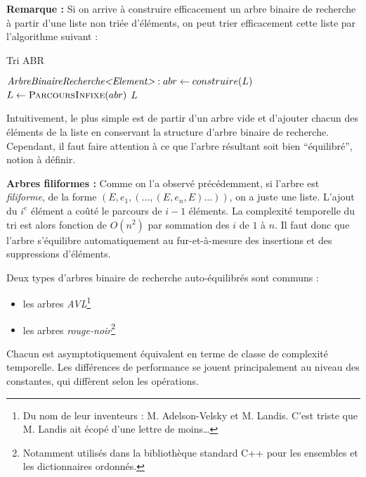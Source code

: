\documentclass[../../../main.tex]{subfiles}
\begin{document}
\textbf{Remarque :} Si on arrive à construire efficacement un arbre binaire de recherche à partir d'une liste non triée d'éléments, on peut trier efficacement cette liste par l'algorithme suivant :

\begin{algorithm}
\caption{Tri ABR\label{alg:arbre_tri_infixe}}
$\textit{ArbreBinaireRecherche\textless{}Element\textgreater}:abr \leftarrow construire(L)$\;
$L\leftarrow \textsc{ParcoursInfixe}(abr)$\;
\Return $L$\;
\end{algorithm}

Intuitivement, le plus simple est de partir d'un arbre vide et d'ajouter chacun des éléments de la liste en conservant la structure d'arbre binaire de recherche. Cependant, il faut faire attention à ce que l'arbre résultant soit bien ``équilibré'', notion à définir. 

\textbf{Arbres filiformes :} Comme on l'a observé précédemment, si l'arbre est \textit{filiforme}, de la forme $(E, e_1, (\dots, (E, e_n, E)\dots))$, on a juste une liste. L'ajout du $i^e$ élément a coûté le parcours de $i-1$ éléments. La complexité temporelle du tri est alors fonction de $O(n^2)$ par sommation des $i$ de $1$ à $n$. Il faut donc que l'arbre s'équilibre automatiquement au fur-et-à-mesure des insertions et des suppressions d'éléments.

Deux types d'arbres binaire de recherche auto-équilibrés sont communs :
\begin{itemize}
	\item les arbres \textit{AVL}\footnote{Du nom de leur inventeurs : M. Adelson-Velsky et M. Landis. C'est triste que M. Landis ait écopé d'une lettre de moins\dots}
	\item les arbres \textit{rouge-noir}\footnote{Notamment utilisés dans la bibliothèque standard C++ pour les ensembles et les dictionnaires ordonnés.}
\end{itemize}
Chacun est asymptotiquement équivalent en terme de classe de complexité temporelle. Les différences de performance se jouent principalement au niveau des constantes, qui diffèrent selon les opérations.
\end{document}
